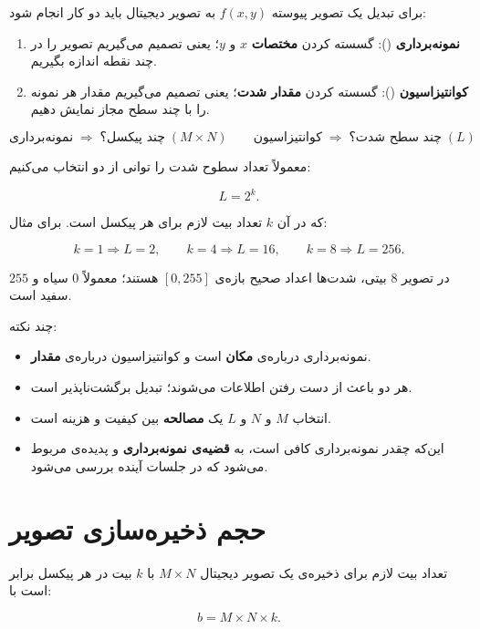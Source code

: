 \documentclass[11pt,a4paper]{article}
\begin{document}
	برای تبدیل یک تصویر پیوسته $f(x,y)$ به تصویر دیجیتال باید دو کار انجام شود:
	
	\begin{enumerate}
		\item \textbf{نمونه‌برداری} (): گسسته کردن \textbf{مختصات}
		$x$ و $y$؛ یعنی تصمیم می‌گیریم تصویر را در چند نقطه اندازه بگیریم.
		\item \textbf{کوانتیزاسیون} (): گسسته کردن \textbf{مقدار شدت}؛
		یعنی تصمیم می‌گیریم مقدار هر نمونه را با چند سطح مجاز نمایش دهیم.
	\end{enumerate}
	
	\[
	\boxed{
		\text{نمونه‌برداری}\;\Rightarrow\;\text{چند پیکسل؟}\;(M\times N)
		\qquad
		\text{کوانتیزاسیون}\;\Rightarrow\;\text{چند سطح شدت؟}\;(L)
	}
	\]
	
	معمولاً تعداد سطوح شدت را توانی از دو انتخاب می‌کنیم:
	
	\[
	L=2^{k}.
	\]
	
	که در آن $k$ تعداد بیت لازم برای هر پیکسل است. برای مثال:
	
	\[
	k=1\Rightarrow L=2,
	\qquad
	k=4\Rightarrow L=16,
	\qquad
	k=8\Rightarrow L=256.
	\]
	
	در تصویر $8$ بیتی، شدت‌ها اعداد صحیح بازه‌ی $[0,255]$ هستند؛
	معمولاً $0$ سیاه و $255$ سفید است.
	
	چند نکته:
	
	\begin{itemize}
		\item نمونه‌برداری درباره‌ی \textbf{مکان} است و کوانتیزاسیون درباره‌ی \textbf{مقدار}.
		\item هر دو باعث از دست رفتن اطلاعات می‌شوند؛ تبدیل برگشت‌ناپذیر است.
		\item انتخاب $M$ و $N$ و $L$ یک \textbf{مصالحه} بین کیفیت و هزینه است.
		\item این‌که چقدر نمونه‌برداری کافی است، به \textbf{قضیه‌ی نمونه‌برداری} و پدیده‌ی
		 مربوط می‌شود که در جلسات آینده بررسی می‌شود.
	\end{itemize}
	
	
	\section{حجم ذخیره‌سازی تصویر}
	
	تعداد بیت لازم برای ذخیره‌ی یک تصویر دیجیتال $M\times N$ با $k$ بیت در هر پیکسل برابر است با:
	
	\[
	b=M\times N\times k.
	\]
	
\end{document}
